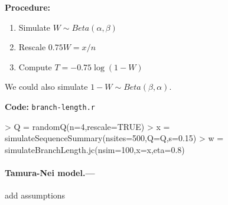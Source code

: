 \documentclass[12pt,letterpaper]{article}
\begin{document}
\textbf{Procedure:}
\begin{enumerate}
\item Simulate $W \sim Beta(\alpha,\beta)$
\item Rescale $0.75W=x/n$
\item Compute $T=-0.75 \log(1-W)$
\end{enumerate}
We could also simulate $1-W \sim Beta(\beta,\alpha)$.

\textbf{Code:} \texttt{branch-length.r}
\begin{Schunk}
\begin{Sinput}
> Q = randomQ(n=4,rescale=TRUE)
> x = simulateSequenceSummary(nsites=500,Q=Q,s=0.15)
> w = simulateBranchLength.jc(nsim=100,x=x,eta=0.8)
\end{Sinput}
\end{Schunk}


\paragraph{Tamura-Nei model.---}
add assumptions
\end{document}
